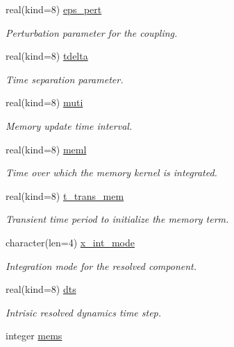 \begin{DoxyCompactItemize}
real(kind=8) \hyperlink{namespacestoch__params_aa0504e89179fe42b3f3206811f1592dc}{eps\+\_\+pert}
\begin{DoxyCompactList}\small\item\em Perturbation parameter for the coupling. \end{DoxyCompactList}\item 
real(kind=8) \hyperlink{namespacestoch__params_a3995bce17d12b533df6b86ab0072b7c3}{tdelta}
\begin{DoxyCompactList}\small\item\em Time separation parameter. \end{DoxyCompactList}\item 
real(kind=8) \hyperlink{namespacestoch__params_a6cfc7910476036f19018641599841686}{muti}
\begin{DoxyCompactList}\small\item\em Memory update time interval. \end{DoxyCompactList}\item 
real(kind=8) \hyperlink{namespacestoch__params_a6de8fcb6d516d431ddc0285e0c296eb7}{meml}
\begin{DoxyCompactList}\small\item\em Time over which the memory kernel is integrated. \end{DoxyCompactList}\item 
real(kind=8) \hyperlink{namespacestoch__params_aad7f7a2481dfb730a051ae2e0de9494c}{t\+\_\+trans\+\_\+mem}
\begin{DoxyCompactList}\small\item\em Transient time period to initialize the memory term. \end{DoxyCompactList}\item 
character(len=4) \hyperlink{namespacestoch__params_ac3dca68023a442b69df79caaaea78894}{x\+\_\+int\+\_\+mode}
\begin{DoxyCompactList}\small\item\em Integration mode for the resolved component. \end{DoxyCompactList}\item 
real(kind=8) \hyperlink{namespacestoch__params_a760f666f9c629b98214821c8186f6ffc}{dts}
\begin{DoxyCompactList}\small\item\em Intrisic resolved dynamics time step. \end{DoxyCompactList}\item 
integer \hyperlink{namespacestoch__params_a1e5a5dc39327df54fe21be20d06cea47}{mems}

\end{DoxyCompactItemize}
